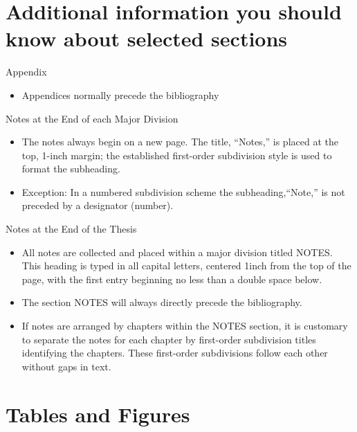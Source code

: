 \section{Additional information you should know about selected sections}

\noindent Appendix
\begin{itemize}
\item Appendices normally precede the bibliography
\end{itemize}
Notes at the End of each Major Division
\begin{itemize}
\item The notes always begin on a new page. The title, \textquotedblleft{}Notes,\textquotedblright{}
is placed at the top, 1-inch margin; the established first-order subdivision
style is used to format the subheading.
\item Exception: In a numbered subdivision scheme the subheading,\textquotedblleft{}Note,\textquotedblright{}
is not preceded by a designator (number).
\end{itemize}
Notes at the End of the Thesis
\begin{itemize}
\item All notes are collected and placed within a major division titled
NOTES. This heading is typed in all capital letters, centered 1inch
from the top of the page, with the first entry beginning no less than
a double space below.
\item The section NOTES will always directly precede the bibliography.
\item If notes are arranged by chapters within the NOTES section, it is
customary to separate the notes for each chapter by first-order subdivision
titles identifying the chapters. These first-order subdivisions follow
each other without gaps in text.
\end{itemize}

\section{Tables and Figures}


